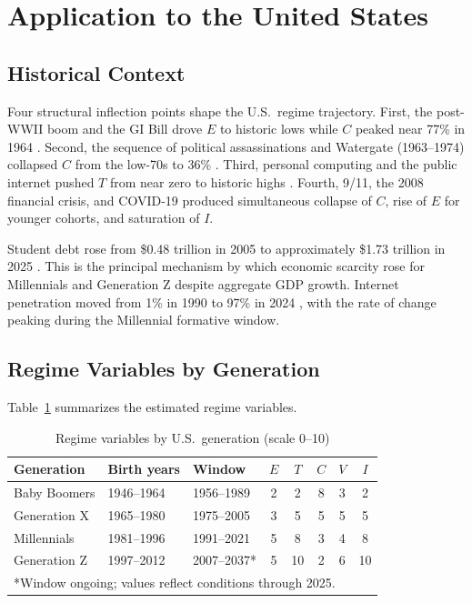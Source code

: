 \documentclass[conference]{IEEEtran}
\begin{document}
\section{Application to the United States}
\label{sec:us}

\subsection{Historical Context}

Four structural inflection points shape the U.S.\ regime trajectory. First, the post-WWII boom and the GI Bill drove $E$ to historic lows while $C$ peaked near 77\% in 1964 \cite{pewresearch2023}. Second, the sequence of political assassinations and Watergate (1963--1974) collapsed $C$ from the low-70s to 36\% \cite{pewresearch2023}. Third, personal computing and the public internet pushed $T$ from near zero to historic highs \cite{oecd2023}. Fourth, 9/11, the 2008 financial crisis, and COVID-19 produced simultaneous collapse of $C$, rise of $E$ for younger cohorts, and saturation of $I$.

Student debt rose from \$0.48 trillion in 2005 to approximately \$1.73 trillion in 2025 \cite{fedreserve2024}. This is the principal mechanism by which economic scarcity rose for Millennials and Generation Z despite aggregate GDP growth. Internet penetration moved from 1\% in 1990 to 97\% in 2024 \cite{oecd2023}, with the rate of change peaking during the Millennial formative window.

\subsection{Regime Variables by Generation}

Table~\ref{tab:regime} summarizes the estimated regime variables.

\begin{table}[htbp]
\caption{Regime variables by U.S.\ generation (scale 0--10)}
\label{tab:regime}
\begin{tabular}{lllccccc}
\toprule
Generation & Birth years & Window & $E$ & $T$ & $C$ & $V$ & $I$ \\
\midrule
Baby Boomers & 1946--1964 & 1956--1989 & 2 & 2 & 8 & 3 & 2 \\
Generation X  & 1965--1980 & 1975--2005 & 3 & 5 & 5 & 5 & 5 \\
Millennials   & 1981--1996 & 1991--2021 & 5 & 8 & 3 & 4 & 8 \\
Generation Z  & 1997--2012 & 2007--2037* & 5 & 10 & 2 & 6 & 10 \\
\bottomrule
\multicolumn{8}{l}{*Window ongoing; values reflect conditions through 2025.}
\end{tabular}
\end{table}
\end{document}
